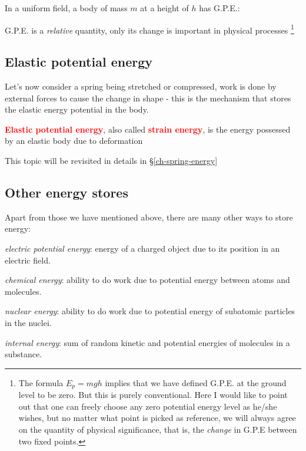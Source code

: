\documentclass[a4paper,12pt]{book}
\newcommand{\cmt}{}
\newenvironment{ilight}
  {\centering
  	\vspace*{6pt}
  	\begin{tcolorbox}[colframe=Gray,colback=LightGrey!15]
  \setlength{\baselineskip}{\baselineskip}%
  }
  {\end{tcolorbox}\vspace*{-4pt}}
\newcommand{\keypoint}[1]{\textbf{\textcolor{red}{#1}}}
\newcommand{\titem}{\item}
\newcommand{\tcbhighmath}[1]{\boxed{#1}}
\newcommand{\keypoint}[1]{\textbf{\textcolor{red}{#1}}}
\newcommand{\cmt}{}
\begin{document}
In a uniform field, a body of mass $m$ at a height of $h$ has G.P.E.: 

\cmt G.P.E. is a \emph{relative} quantity, only its change is important in physical processes
\footnote{The formula $E_p = mgh$ implies that we have defined G.P.E. at the ground level to be zero. But this is purely conventional. Here I would like to point out that one can freely choose any zero potential energy level as he/she wishes, but no matter what point is picked as reference, we will always agree on the quantity of physical significance, that is, the \emph{change} in G.P.E between two fixed points.}

\subsection{Elastic potential energy}

Let's now consider a spring being stretched or compressed, work is done by external forces to cause the change in shape - this is the mechanism that stores the elastic energy potential in the body.

\begin{ilight}
	\keypoint{Elastic potential energy}, also called \keypoint{strain energy}, is the energy possessed by an elastic body due to deformation 
\end{ilight}

This topic will be revisited in details in \S\ref{ch-spring-energy}

\subsection{Other energy stores}

Apart from those we have mentioned above, there are many other ways to store energy:

\titem \emph{electric potential energy}: energy of a charged object due to its position in an electric field.

\titem \emph{chemical energy}: ability to do work due to potential energy between atoms and molecules.

\titem \emph{nuclear energy}: ability to do work due to potential energy of subatomic particles in the nuclei.

\titem \emph{internal energy}: sum of random kinetic and potential energies of molecules in a substance.
\end{document}
